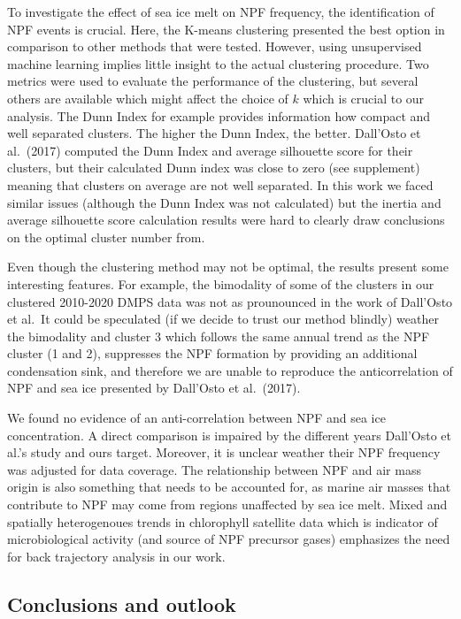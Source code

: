 \documentclass[11pt]{article}
\begin{document}
To investigate the effect of sea ice melt on NPF frequency, the
identification of NPF events is crucial. Here, the K-means clustering
presented the best option in comparison to other methods that were
tested. However, using unsupervised machine learning implies little
insight to the actual clustering procedure. Two metrics were used to
evaluate the performance of the clustering, but several others are
available which might affect the choice of \(k\) which is crucial to our
analysis. The Dunn Index for example provides information how compact
and well separated clusters. The higher the Dunn Index, the better.
Dall'Osto et al.~(2017) computed the Dunn Index and average silhouette
score for their clusters, but their calculated Dunn index was close to
zero (see supplement) meaning that clusters on average are not well
separated. In this work we faced similar issues (although the Dunn Index
was not calculated) but the inertia and average silhouette score
calculation results were hard to clearly draw conclusions on the optimal
cluster number from.

Even though the clustering method may not be optimal, the results
present some interesting features. For example, the bimodality of some
of the clusters in our clustered 2010-2020 DMPS data was not as
prounounced in the work of Dall'Osto et al.~It could be speculated (if
we decide to trust our method blindly) weather the bimodality and
cluster 3 which follows the same annual trend as the NPF cluster (1 and
2), suppresses the NPF formation by providing an additional condensation
sink, and therefore we are unable to reproduce the anticorrelation of
NPF and sea ice presented by Dall'Osto et al.~(2017).

We found no evidence of an anti-correlation between NPF and sea ice
concentration. A direct comparison is impaired by the different years
Dall'Osto et al.'s study and ours target. Moreover, it is unclear
weather their NPF frequency was adjusted for data coverage. The
relationship between NPF and air mass origin is also something that
needs to be accounted for, as marine air masses that contribute to NPF
may come from regions unaffected by sea ice melt. Mixed and spatially
heterogenoues trends in chlorophyll satellite data which is indicator of
microbiological activity (and source of NPF precursor gases) emphasizes
the need for back trajectory analysis in our work.

    \hypertarget{conclusions-and-outlook}{%
\subsection{Conclusions and outlook}\label{conclusions-and-outlook}}
\end{document}
